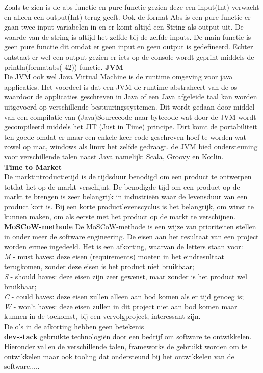 Zoals te zien is de abs functie en pure functie gezien deze een input(Int) verwacht en alleen een output(Int) terug geeft. Ook de format Abs is een pure functie er gaan twee input variabelen in en er komt altijd een String als output uit. De waarde van de string is altijd het zelfde bij de zelfde inputs. De main functie is geen pure functie dit omdat er geen input en geen output is gedefineerd. Echter ontstaat er wel een output gezien er iets op de console wordt geprint middels de println(formatabs(-42)) functie.
\textbf{JVM}\\
De JVM ook wel Java Virtual Machine is de runtime omgeving voor java applicaties. Het voordeel is dat een JVM de runtime abstraheert van de os waardoor de applicaties geschreven in Java of een Java afgeleide taal kan worden uitgevoerd op verschillende bestuuringssystemen. Dit wordt gedaan door middel van een compilatie van (Java)Sourcecode naar bytecode wat door de JVM wordt gecompileerd middels het JIT (Just in Time) principe. Dirt komt de portabiliteit ten goede omdat er maar een enkele keer code geschreven hoef te worden wat zowel op mac, windows als linux het zelfde gedraagt. de JVM bied ondersteuning voor verschillende talen naast Java namelijk: Scala, Groovy en Kotlin.\\
\textbf{Time to Market}\\
De marktintroductietijd is de tijdsduur benodigd om een product te ontwerpen totdat het op de markt verschijnt. De benodigde tijd om een product op de markt te brengen is zeer belangrijk in industrieën waar de levensduur van een product kort is. Bij een korte productlevenscyclus is het belangrijk, om winst te kunnen maken, om als eerste met het product op de markt te verschijnen.\\

\textbf{MoSCoW-methode}
De MoSCoW-methode is een wijze van prioriteiten stellen in onder meer de software engineering. De eisen aan het resultaat van een project worden ermee ingedeeld. Het is een afkorting, waarvan de letters staan voor:\\
\textit{M} - must haves: deze eisen (requirements) moeten in het eindresultaat terugkomen, zonder deze eisen is het product niet bruikbaar;\\
\textit{S} - should haves: deze eisen zijn zeer gewenst, maar zonder is het product wel bruikbaar;\\
\textit{C} - could haves: deze eisen zullen alleen aan bod komen als er tijd genoeg is;\\
\textit{W} - won't haves: deze eisen zullen in dit project niet aan bod komen maar kunnen in de toekomst, bij een vervolgproject, interessant zijn.\\
De o's in de afkorting hebben geen betekenis\\

\textbf{dev-stack}
gebruikte technologi\"en door een bedrijf om software te ontwikkelen. Hieronder vallen de verschillende talen, frameworks de gebruikt worden om te ontwikkelen maar ook tooling dat ondersteund bij het ontwikkelen van de software.....
